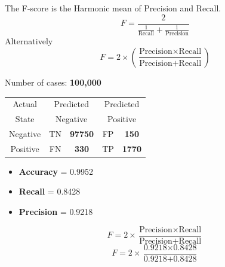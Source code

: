 \documentclass[]{report}
\begin{document}


 The F-score is the Harmonic mean of Precision and Recall.
\[ F = \frac{2}{\frac{1}{\mbox{Recall}} + \frac{1}{\mbox{Precision}}} \]
Alternatively
\[ F = 2 \times \left( \frac{\mbox{Precision} \times \mbox{Recall}}{\mbox{Precision} + \mbox{Recall}} \right) \] 




\begin{framed}

Number of cases: \textbf{100,000}\\ 
\begin{center}

\begin{table}[!h]
\begin{tabular}{c *4c}

Actual &  \multicolumn{2}{c}{Predicted} & \multicolumn{2}{c}{Predicted}\\
State &  \multicolumn{2}{c}{Negative} & \multicolumn{2}{c}{Positive}\\

Negative   & \phantom{spa} TN & \textbf{97750}\phantom{spa}   & FP  & \textbf{150}\\
Positive   & \phantom{spa} FN & \textbf{330} \phantom{spa}   & TP  & \textbf{1770}\\


\end{tabular}
\end{table}
\end{center}
\end{framed}

\begin{itemize}
\item \textbf{Accuracy} = 0.9952
\item \textbf{Recall} = 0.8428
\item \textbf{Precision} = 0.9218
\end{itemize}




\[ F = 2 \times \frac{\mbox{Precision} \times \mbox{Recall}}{\mbox{Precision} + \mbox{Recall}}\]\bigskip
\[ F = 2 \times \frac{\mbox{0.9218} \times \mbox{0.8428}}{\mbox{0.9218} + \mbox{0.8428}}\] 
\end{document}
